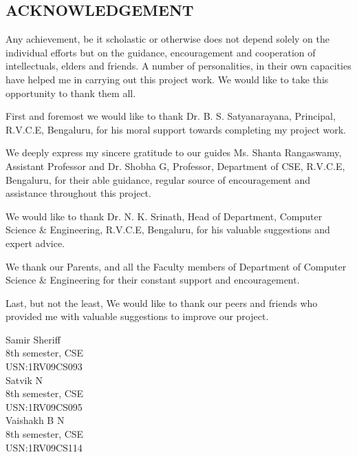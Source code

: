 \documentclass[12pt]{report}
\begin{document}
  
\setcounter{page}{1}
\begin{center}
\section*{ACKNOWLEDGEMENT}
\end{center}
Any achievement, be it scholastic or otherwise does not depend solely on the individual efforts but on the guidance, encouragement and cooperation of intellectuals, elders and friends. A number of personalities, in their own capacities have helped me in carrying out this project work. We would like to take this opportunity to thank them all.

First and foremost we would like to thank Dr. B. S. Satyanarayana, Principal, R.V.C.E, Bengaluru, for his moral support towards completing my project work.

We deeply express my sincere gratitude to our guides Ms. Shanta Rangaswamy, Assistant Professor and Dr. Shobha G, Professor, Department of CSE, R.V.C.E, Bengaluru, for their able guidance, regular source of encouragement and assistance throughout this project. 

We would like to thank Dr. N. K. Srinath, Head of Department, Computer Science \& Engineering, R.V.C.E, Bengaluru, for his valuable suggestions and expert advice.

We thank our Parents, and all the Faculty members of Department of Computer Science \& Engineering for their constant support and encouragement.

Last, but not the least, We would like to thank our peers and friends who provided me with valuable suggestions to improve our project.
\begin{flushright}
Samir Sheriff\\
8th semester, CSE\\
USN:1RV09CS093\\

Satvik N\\
8th semester, CSE\\
USN:1RV09CS095\\

Vaishakh B N\\ 
8th semester, CSE\\
USN:1RV09CS114\\

\end{flushright}
\end{document}
